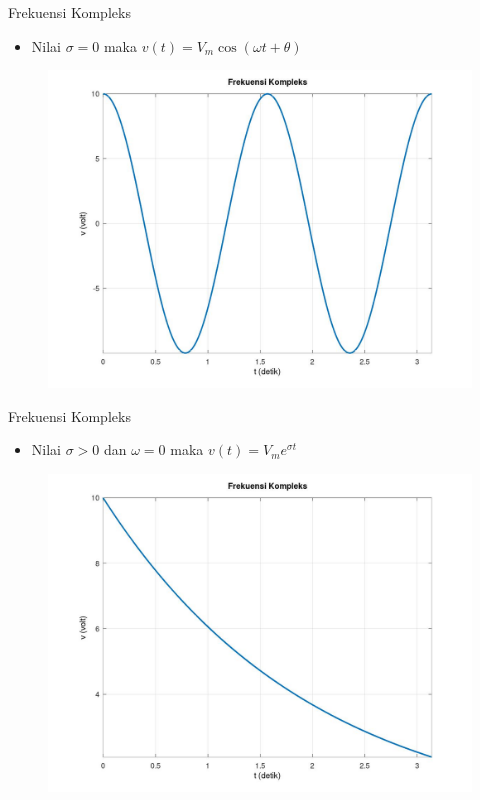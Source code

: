 \documentclass[10pt]{beamer}
\begin{document}
\begin{frame}{Frekuensi Kompleks}
    \begin{itemize}
        \item Nilai $ \sigma = 0 $ maka $ v(t) = V_m \cos(\omega t + \theta) $
    \end{itemize}
    
    \begin{figure}
        \includegraphics[width=0.8\linewidth]{gambar2.jpg}
    \end{figure}
\end{frame}

\begin{frame}{Frekuensi Kompleks}
    \begin{itemize}
        \item Nilai $ \sigma > 0 $ dan $ \omega = 0 $ maka $ v(t) = V_m e^{\sigma t} $
    \end{itemize}
    
    \begin{figure}
        \includegraphics[width=0.8\linewidth]{gambar3.jpg}
    \end{figure}
\end{frame}
\end{document}
